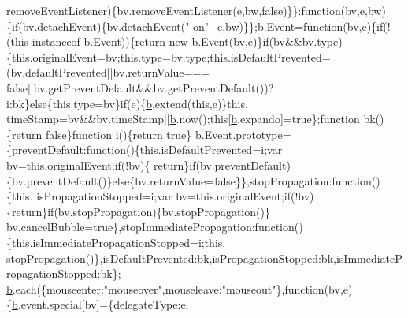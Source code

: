 \begin{DoxyCode}
      removeEventListener)\{bv.removeEventListener(e,bw,\textcolor{keyword}{false})\}\}:\textcolor{keyword}{function}(bv,e,bw)\{\textcolor{keywordflow}{if}(bv.detachEvent)\{bv.detachEvent(\textcolor{stringliteral}{"
      on"}+e,bw)\}\};\hyperlink{jquery_8js_aa4026ad5544b958e54ce5e106fa1c805}{b}.Event=\textcolor{keyword}{function}(bv,e)\{\textcolor{keywordflow}{if}(!(\textcolor{keyword}{this} instanceof \hyperlink{jquery_8js_aa4026ad5544b958e54ce5e106fa1c805}{b}.Event))\{\textcolor{keywordflow}{return} \textcolor{keyword}{new} \hyperlink{jquery_8js_aa4026ad5544b958e54ce5e106fa1c805}{b}.Event(bv,e)\}\textcolor{keywordflow}{if}(bv&&bv.type)
      \{this.originalEvent=bv;this.type=bv.type;this.isDefaultPrevented=(bv.defaultPrevented||bv.returnValue===\textcolor{keyword}{
      false}||bv.getPreventDefault&&bv.getPreventDefault())?i:bk\}\textcolor{keywordflow}{else}\{this.type=bv\}\textcolor{keywordflow}{if}(e)\{\hyperlink{jquery_8js_aa4026ad5544b958e54ce5e106fa1c805}{b}.extend(\textcolor{keyword}{this},e)\}this.
      timeStamp=bv&&bv.timeStamp||\hyperlink{jquery_8js_aa4026ad5544b958e54ce5e106fa1c805}{b}.now();\textcolor{keyword}{this}[\hyperlink{jquery_8js_aa4026ad5544b958e54ce5e106fa1c805}{b}.expando]=\textcolor{keyword}{true}\};\textcolor{keyword}{function} bk()\{\textcolor{keywordflow}{return} \textcolor{keyword}{false}\}\textcolor{keyword}{function} i()\{\textcolor{keywordflow}{return} \textcolor{keyword}{true}\}
      \hyperlink{jquery_8js_aa4026ad5544b958e54ce5e106fa1c805}{b}.Event.prototype=\{preventDefault:\textcolor{keyword}{function}()\{this.isDefaultPrevented=i;var bv=this.originalEvent;\textcolor{keywordflow}{if}(!bv)\{\textcolor{keywordflow}{
      return}\}\textcolor{keywordflow}{if}(bv.preventDefault)\{bv.preventDefault()\}\textcolor{keywordflow}{else}\{bv.returnValue=\textcolor{keyword}{false}\}\},stopPropagation:\textcolor{keyword}{function}()\{this.
      isPropagationStopped=i;var bv=this.originalEvent;\textcolor{keywordflow}{if}(!bv)\{\textcolor{keywordflow}{return}\}\textcolor{keywordflow}{if}(bv.stopPropagation)\{bv.stopPropagation()\}
      bv.cancelBubble=\textcolor{keyword}{true}\},stopImmediatePropagation:\textcolor{keyword}{function}()\{this.isImmediatePropagationStopped=i;this.
      stopPropagation()\},isDefaultPrevented:bk,isPropagationStopped:bk,isImmediatePropagationStopped:bk\};
      \hyperlink{jquery_8js_aa4026ad5544b958e54ce5e106fa1c805}{b}.each(\{mouseenter:\textcolor{stringliteral}{"mouseover"},mouseleave:\textcolor{stringliteral}{"mouseout"}\},\textcolor{keyword}{function}(bv,e)\{\hyperlink{jquery_8js_aa4026ad5544b958e54ce5e106fa1c805}{b}.event.special[bv]=\{delegateType:e,

\end{DoxyCode}
